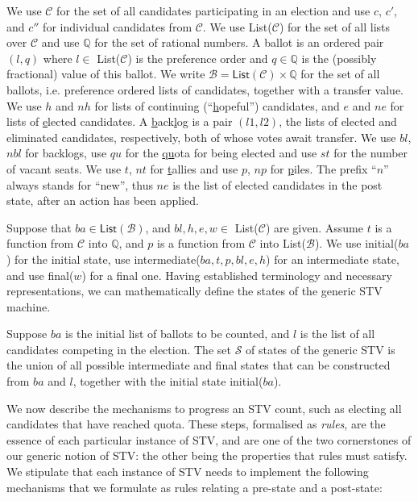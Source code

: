 \documentclass{llncs}
\begin{document}
\noindent
We use
$\mathcal{C}$ 
for the set of all candidates participating in an
election and use $c$, $c'$, and $c''$ for individual candidates from 
$\mathcal{C}$. We use 
\textsf{List}($\mathcal{C}$)
for the set of all lists over
$\mathcal{C}$ and
use 
$\mathbb{Q}$ 
for the set of rational numbers.
A ballot is an ordered pair
$(l,q)$ where 
$l\in$ \textsf{List}($\mathcal{C}$) is the preference order and
$q\in\mathbb{Q}$ is the (possibly fractional) value of this ballot.
We write $\mathcal{B} = 
\mathsf{List}(\mathcal{C})\times\mathbb{Q}$ for the set of all
ballots, i.e. preference ordered lists of candidates, together with
a transfer value. 
We use $h$ and $nh$ for lists
of continuing (``\underline{h}opeful'') candidates, and $e$ and $ne$ for lists of
\underline{e}lected candidates.
A \underline{b}ack\underline{l}og is a
pair $(l1,l2)$, the lists of elected and eliminated
candidates, respectively,
both of whose votes await transfer. 
We use $bl$, $nbl$ for backlogs, use 
$qu$ for the \underline{qu}ota for being
elected and use $st$ for the number of vacant seats. 
We use $t$, $nt$ for \underline{t}allies and use $p$, $np$ for \underline{p}iles.
The prefix ``$n$'' always stands for ``new'', 
thus $\mathit{ne}$ is the list of elected candidates in the post state,
after an action has been applied.

Suppose that $ba \in \mathsf{List}(\mathcal{B})$, and $bl , h, e, w \in$
\textsf{List}($\mathcal{C}$) are given. Assume $t$ is a
function from $\mathcal{C}$ into $\mathbb{Q}$, and $p$ is a function
from $\mathcal{C}$ into \textsf{List}($\mathcal{B}$). We use
\textsf{initial}($ba$) for the initial state, use 
\textsf{intermediate}($ba, t, p, bl, e, h$)
for an intermediate state, and use
\textsf{final}($w$) for a final one. 
Having established terminology and necessary
representations, we can mathematically define the states of the
generic STV machine.  

\begin{definition}\label{stv:states}
Suppose $ba$ is the initial list of ballots to be counted, and
$l$ is the list of all candidates competing in the election. 
The set $\mathcal{S}$ of states of the generic STV is the union of
all 
possible intermediate and final states that can be constructed from $ba$ and $l$,
together with the initial state \textsf{initial}($ba$).
\end{definition}

We now describe the mechanisms to progress an STV count, such as
electing all candidates that have reached quota. 
These steps, formalised as \emph{rules},  are the essence of each 
particular instance of 
STV, and are one of the two cornerstones of our generic notion of STV: the
other being the properties that rules must satisfy. We stipulate
that each instance of STV needs to implement the following
mechanisms that we formulate as rules relating a pre-state and a
post-state:
\end{document}

